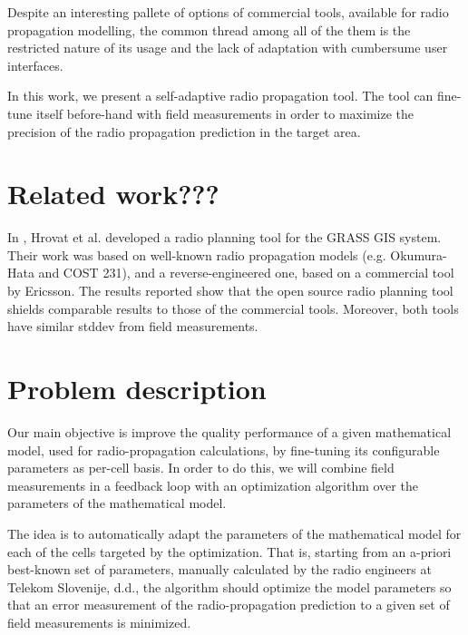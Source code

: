 Despite an interesting pallete of options of commercial tools, available
for radio propagation modelling, the common thread among all of the
them is the restricted nature of its usage and the lack of adaptation
with cumbersume user interfaces.

In this work, we present a self-adaptive radio propagation tool. The
tool can fine-tune itself before-hand with field measurements in order
to maximize the precision of the radio propagation prediction in the
target area.




\section{Related work???}

In \cite{Ozimek_Open.source.radio.coverage.prediction:2010}, Hrovat
et al. developed a radio planning tool for the GRASS GIS system. Their
work was based on well-known radio propagation models (e.g. Okumura-Hata
and COST 231), and a reverse-engineered one, based on a commercial
tool by Ericsson. The results reported show that the open source radio
planning tool shields comparable results to those of the commercial
tools. Moreover, both tools have similar stddev from field measurements.


\section{Problem description}

Our main objective is improve the quality performance of a given mathematical
model, used for radio-propagation calculations, by fine-tuning its
configurable parameters as per-cell basis. In order to do this, we
will combine field measurements in a feedback loop with an optimization
algorithm over the parameters of the mathematical model.

The idea is to automatically adapt the parameters of the mathematical
model for each of the cells targeted by the optimization. That is,
starting from an a-priori best-known set of parameters, manually calculated
by the radio engineers at Telekom Slovenije, d.d., the algorithm should
optimize the model parameters so that an error measurement of the
radio-propagation prediction to a given set of field measurements
is minimized.

